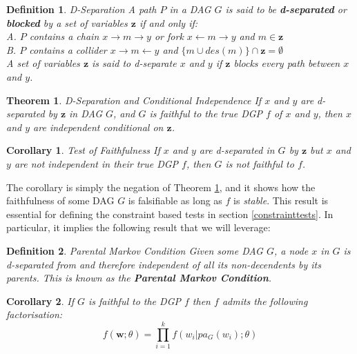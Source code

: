 \documentclass{article}
\newtheorem{definition}{Definition}
\newtheorem{corollary}{Corollary}
\newtheorem{theorem}{Theorem}
\begin{document}
\begin{definition}{D-Separation}
  A path $P$ in a DAG $G$ is said to be \textbf{d-separated} or \textbf{blocked} by a set of variables $\mathbf{z}$ if and only if: \\
  A. $P$ contains a chain $x \rightarrow m \rightarrow y$ or fork $x \leftarrow m \rightarrow y$ and $m \in \mathbf{z}$ \\
  B. $P$ contains a collider $x \rightarrow m \leftarrow y$ and $\{m \cup des(m)\} \cap \mathbf{z} = \emptyset$ \\
  A set of variables $\mathbf{z}$ is said to \textit{d-separate} $x$ and $y$ if $\mathbf{z}$ blocks every path between $x$ and $y$.
  \parencite[p.16]{pearl2009causality}
  \label{dseparation}
\end{definition}

\theoremstyle{theorem}
\begin{theorem}{D-Separation and Conditional Independence}
  If $x$ and $y$ are d-separated by $\mathbf{z}$ in DAG $G$, and $G$ is faithful to the true DGP $f$ of $x$ and $y$, then $x$ and $y$ are independent conditional on $\mathbf{z}$. 
  \parencite[p.16]{pearl2009causality}
  \label{dseptheorem}
\end{theorem}
\theoremstyle{corollary}
\begin{corollary}{Test of Faithfulness}
  If $x$ and $y$ are d-separated in $G$ by $\mathbf{z}$ but $x$ and $y$ are not independent in their true DGP $f$, then $G$ is not faithful to $f$.
  \label{faithful_corollary}
\end{corollary}

The corollary is simply the negation of Theorem \ref{dseptheorem}, and it shows how the faithfulness of some DAG $G$ is falsifiable as long as $f$ is \textit{stable}. This result is essential for defining the constraint based tests in section \ref{constrainttests}. In particular, it implies the following result that we will leverage:

\theoremstyle{corollary}
\begin{definition}{Parental Markov Condition}
  Given some DAG $G$, a node $x$ in $G$ is d-separated from and therefore independent of all its non-decendents by its parents. This is known as the \textbf{Parental Markov Condition}. 
  \parencite[p.16, p.19]{pearl2009causality}
  \label{markovcompatibility}
\end{definition}

\theoremstyle{corollary}
\begin{corollary}
  If $G$ is faithful to the DGP $f$ then $f$ admits the following factorisation:
  \begin{equation}
    f(\mathbf{w};\theta) = \prod_{i=1}^{k} f(w_i | pa_G(w_i);\theta)
  \end{equation}
\end{corollary}
\end{document}
